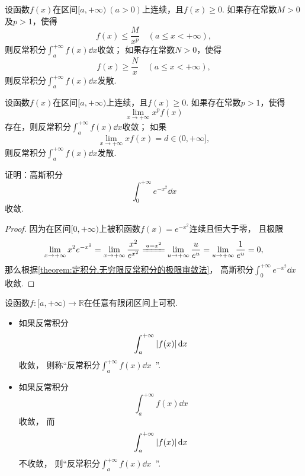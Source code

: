 \begin{theorem}[比较审敛法]\label{theorem:定积分.无穷限反常积分的比较审敛法}
设函数\(f(x)\)在区间\([a,+\infty)\ (a>0)\)上连续，且\(f(x) \geq 0\).
如果存在常数\(M>0\)及\(p>1\)，使得\[
f(x) \leq \frac{M}{x^p} \quad (a \leq x < +\infty),
\]则反常积分\(\int_a^{+\infty} f(x) \dd{x}\)收敛；
如果存在常数\(N>0\)，使得\[
f(x) \geq \frac{N}{x} \quad (a \leq x < +\infty),
\]则反常积分\(\int_a^{+\infty} f(x) \dd{x}\)发散.
\end{theorem}

\begin{theorem}[极限审敛法]\label{theorem:定积分.无穷限反常积分的极限审敛法}
设函数\(f(x)\)在区间\([a,+\infty)\)上连续，且\(f(x) \geq 0\).
如果存在常数\(p > 1\)，使得\[
\lim_{x \to +\infty} x^p f(x)
\]存在，则反常积分\(\int_a^{+\infty} f(x) \dd{x}\)收敛；
如果\[
\lim_{x \to +\infty} x f(x) = d \in (0,+\infty],
\]则反常积分\(\int_a^{+\infty} f(x) \dd{x}\)发散.
\end{theorem}

\begin{example}\label{example:定积分.高斯积分的收敛性}
证明：高斯积分\[
\int_0^{+\infty} e^{-x^2} \dd{x}
\]收敛.
\begin{proof}
因为在区间\([0,+\infty)\)上被积函数\(f(x) = e^{-x^2}\)连续且恒大于零，
且极限\[
\lim_{x\to+\infty} x^2 e^{-x^2}
= \lim_{x\to+\infty} \frac{x^2}{e^{x^2}}
\xlongequal{u=x^2} \lim_{u\to+\infty} \frac{u}{e^u}
= \lim_{u\to+\infty} \frac{1}{e^u}
= 0,
\]
那么根据\cref{theorem:定积分.无穷限反常积分的极限审敛法}，
高斯积分\(\int_0^{+\infty} e^{-x^2} \dd{x}\)收敛.
\end{proof}
\end{example}

\begin{definition}
设函数\(f\colon[a,+\infty)\to\mathbb{R}\)在任意有限闭区间上可积.
\begin{itemize}
	\item 如果反常积分\[
		\int_a^{+\infty} \abs{f(x)} \dd{x}
	\]收敛，
	则称“反常积分\(\int_a^{+\infty} f(x) \dd{x}\)~”.

	\item 如果反常积分\[
		\int_a^{+\infty} f(x) \dd{x}
	\]收敛，
	而\[
		\int_a^{+\infty} \abs{f(x)} \dd{x}
	\]不收敛，
	则“反常积分\(\int_a^{+\infty} f(x) \dd{x}\)~”.
\end{itemize}
\end{definition}

